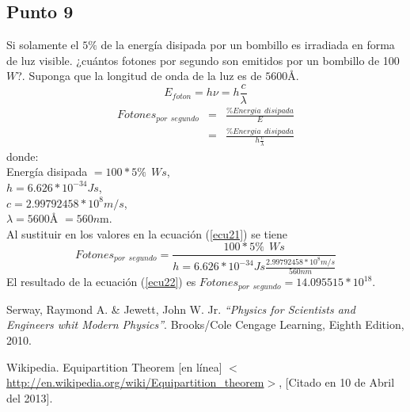 \documentclass[11pt,graphicx,caption,rotating]{article}
\begin{document}
\subsection{Punto 9}
\noindent
Si solamente el $5\%$ de la energía disipada por un bombillo es irradiada en forma de luz visible. ¿cuántos fotones por segundo son emitidos por un bombillo de 100 $W$?. Suponga que la longitud de onda de la luz es de $5600$\AA{}.\[\]
\noindent
\begin{equation}
 E_{foton}= h\nu = h\frac{c}{\lambda}
\label{ecu19}
\end{equation}
\begin{eqnarray}
 Fotones_{por\ \ segundo} & = & \frac{\%Energia\ \ disipada}{E}\\\label{ecu20}
& = & \frac{\%Energia\ \ disipada}{h\frac{c}{\lambda}}\label{ecu21}
\end{eqnarray}
\noindent
donde:\\
Energía disipada $= 100 * 5\% \ \ Ws$,\\
$h = 6.626 * 10^{-34}J s$,\\
$c = 2.99792458* 10^{8} m/s$,\\
$\lambda = 5600$\AA{} $= 560n$m.\\
Al sustituir en los valores en la ecuación (\ref{ecu21}) se tiene 
\begin{equation}
 Fotones_{por\ \ segundo} = \frac{100 * 5\% \ \ W s}{h = 6.626 * 10^{-34}J s \frac{2.99792458* 10^{8} m/s}{560nm}}
\label{ecu22}
\end{equation}
El resultado de la ecuación (\ref{ecu22}) es $Fotones_{por\ \ segundo} = 14.095515 *10^{18}$.


\begin{thebibliography}{99}
 Serway, Raymond A. \& Jewett, John W. Jr.
{\em "`Physics for Scientists and Engineers whit Modern Physics"'}.
Brooks/Cole Cengage Learning, Eighth Edition, 2010.

 Wikipedia. Equipartition Theorem [en línea] $<$ \url{http://en.wikipedia.org/wiki/Equipartition_theorem}$>$, [Citado en 10 de Abril del 2013].
\end{thebibliography}
\end{document}
